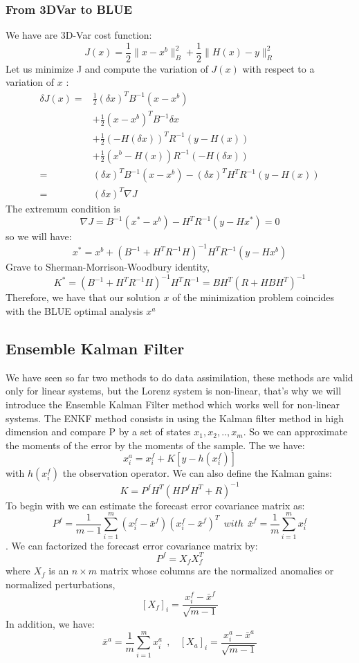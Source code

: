 \subsubsection{From 3DVar to BLUE}
\noindent We have are 3D-Var cost function:
$$J(x)=\frac{1}{2}\|x-x^b\|_B^2+\frac{1}{2}\|H(x)-y\|_{R}^2 $$
 Let us minimize J and compute the variation of $J(x)$ with respect to
a variation of $x$ :
$$\begin{aligned}
\delta J(x)=&\frac{1}{2}(\delta x)^TB^{-1}(x-x^b) \\
&+\frac{1}{2}(x-x^b)^TB^{-1}\delta x \\ &+\frac{1}{2}(-H(\delta x))^TR^{-1}(y-H(x)) \\
&+\frac{1}{2}(x^b-H(x))R^{-1}(-H(\delta x)) \\
=&(\delta x)^TB^{-1}(x-x^b)-(\delta x)^TH^TR^{-1}(y-H(x)) \\
=&(\delta x)^T \nabla J
\end{aligned}$$
The extremum condition is 
$$\nabla J=B^{-1}(x^*-x^b)-H^TR^{-1}(y-Hx^*)=0$$
so we will have:
$$x^*=x^b+(B^{-1}+H^TR^{-1}H)^{-1}H^TR^{-1}(y-Hx^b)$$
Grave to Sherman-Morrison-Woodbury identity,
$$K^*=(B^{-1}+H^TR^{-1}H)^{-1}H^TR^{-1}=BH^T(R+HBH^T)^{-1}$$
Therefore, we have that our solution $x$ of the minimization problem coincides with the BLUE optimal analysis $x^a$
\subsection{Ensemble Kalman Filter}
\noindent We have seen so far two methods to do data assimilation, these methods are valid only for linear systems, but the Lorenz system is non-linear, that's why we will introduce the Ensemble Kalman Filter method which works well for non-linear systems. The ENKF method consists in using the Kalman filter method in high dimension and compare P by a set of states $x_1,x_2,..,x_{m}$. So we can approximate the moments of the error by the moments of the sample.
The we have:
$$x_i^a=x_i^f+K[y-h(x_i^f)]$$
with $h(x_i^f)$ the observation operator.
We can also define the Kalman gains: 
$$K=P^f H^T(HP^f H^T+R)^{-1}$$
To begin with we can estimate the
forecast error covariance matrix as:
$$P^f=\frac{1}{m-1}\sum_{i=1}^{m}(x_i^f-\bar{x}^f)(x_i^f-\bar{x}^f)^T~~with~~\bar{x}^f=\frac{1}{m}\sum_{i=1}^{m}x_i^f $$ .
We can factorized the forecast error covariance matrix by:
$$P^f=X_f X_f^T$$
where $X_f$ is an $n \times m$ matrix whose columns are the normalized anomalies or normalized perturbations,
$$[X_f]_i=\frac{x_i^f-\bar{x}^f}{\sqrt{m-1}}$$
In addition, we have:
$$
\bar{x}^a=\frac{1}{m}\sum_{i=1}^mx_i^a~~,~~~~[X_a]_i=\frac{x_i^a-\bar{x}^a}{\sqrt{m-1}} $$
